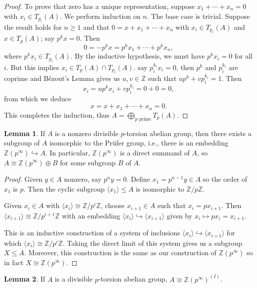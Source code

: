 \documentclass[12pt]{article}
\theoremstyle{definition}
\newtheorem{lemma}{Lemma}
\newcommand{\Z}{\mathbb{Z}}
\newcommand{\<}{\langle}
\renewcommand{\>}{\rangle}
\newcommand{\iso}{\cong}
\newcommand{\inc}{\hookrightarrow}
\renewcommand{\_}[1]{{_{#1}}}
\begin{document}
\begin{proof}
    To prove that zero has a unique representation, suppose $x_1 + \cdots + x_n = 0$ with $x_i \in T_{p_i}(A)$.
    We perform induction on $n$.
    The base case is trivial.
    Suppose the result holds for $n \geq 1$ and that $0 = x + x_1 + \cdots + x_n$ with $x_i \in T_{p_i}(A)$ and $x \in T_p(A)$; say $p^kx = 0$.
    Then
    \[
        0 = -p^kx = p^kx_1 + \cdots + p^kx_n,
    \]
    where $p^kx_i \in T_{p_i}(A)$.
    By the inductive hypothesis, we must have $p^kx_i = 0$ for all $i$.
    But this implies $x_i \in T_p(A) \cap T_{p_i}(A)$.
    say $p_i^{k_i}x_i = 0$, then $p^k$ and $p_i^{k_i}$ are coprime and B\'ezout's Lemma gives us $u, v \in \Z$ such that $up^k + vp_i^{k_i} = 1$.
    Then
    \[
        x_i = up^kx_i + vp_i^{k_i} = 0 + 0 = 0,
    \]
    from which we deduce
    \[
        x = x + x_1 + \cdots + x_n = 0.
    \]
    This completes the induction, thus $A = \bigoplus_{p \text{ prime}} T_p(A)$.
\end{proof}

\begin{lemma}\label{lem:ptor_pruefer}
    If $A$ is a nonzero divisible $p$-torsion abelian group, then there exists a subgroup of $A$ isomorphic to the Pr\"ufer group, i.e., there is an embedding $\Z(p^\infty) \inc A$.
    In particular, $\Z(p^\infty)$ is a direct summand of $A$, so $A \iso \Z(p^\infty) \oplus B$ for some subgroup $B$ of $A$.
\end{lemma}

\begin{proof}
    Given $y \in A$ nonzero, say $p^ny = 0$.
    Define $x_1 = p^{n-1}y \in A$ so the order of $x_1$ is $p$.
    Then the cyclic subgroup $\<x_1\> \leq A$ is isomorphic to $\Z/p\Z$.

    Given $x_i \in A$ with $\<x_i\> \iso \Z/p^i\Z$, choose $x_{i+1} \in A$ such that $x_i = px_{i+1}$.
    Then $\<x_{i+1}\> \iso \Z/p^{i+1}\Z$ with an embedding $\<x_i\> \inc \<x_{i+1}\>$ given by $x_i \mapsto px_i = x_{i+1}$.

    This is an inductive construction of a system of inclusions $\<x_i\> \inc \<x_{i+1}\>$ for which $\<x_i\> \iso \Z/p^i\Z$.
    Taking the direct limit of this system gives us a subgroup $X \leq A$.
    Moreover, this construction is the same as our construction of $\Z(p^\infty)$ so in fact $X \iso \Z(p^\infty)$.
\end{proof}

\begin{lemma}\label{lem:divab_ptor}
    If $A$ is a divisible $p$-torsion abelian group, $A \iso \Z(p^\infty)^{(I)}$.
\end{lemma}
\end{document}
